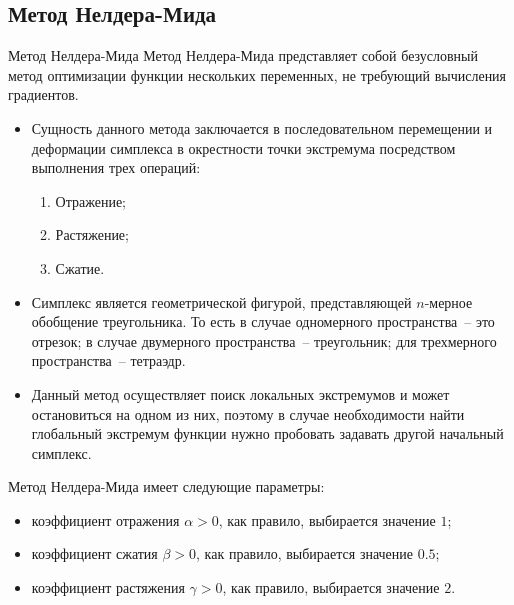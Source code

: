 \documentclass[aspectratio=169, mathserif]{beamer}	%
\begin{document}
\subsection{Метод Нелдера-Мида}

\begin{frame}[fragile]{Метод Нелдера-Мида}
\scriptsize
Метод Нелдера-Мида представляет собой безусловный метод оптимизации функции нескольких переменных, не требующий вычисления градиентов.
\begin{itemize}
	\item Сущность данного метода заключается в последовательном перемещении и деформации симплекса в окрестности точки экстремума посредством выполнения трех операций:

\begin{enumerate}
	\scriptsize
	\item Отражение;
	\item Растяжение;
	\item Сжатие.
\end{enumerate}

	\item Симплекс является геометрической фигурой, представляющей $n$-мерное обобщение треугольника. То есть в случае одномерного пространства~-- это отрезок; в случае двумерного пространства~-- треугольник; для трехмерного пространства~-- тетраэдр.
	\item Данный метод осуществляет поиск локальных экстремумов и может остановиться на одном из них, поэтому в случае необходимости найти глобальный экстремум функции нужно пробовать задавать другой начальный симплекс.
\end{itemize}
Метод Нелдера-Мида  имеет следующие параметры:
\begin{itemize}
	\item коэффициент отражения $\alpha > 0$, как правило, выбирается значение $1$;
	\item коэффициент сжатия $\beta > 0$, как правило, выбирается значение $0.5$;
	\item коэффициент растяжения $\gamma > 0$, как правило, выбирается значение $2$.
\end{itemize}
\vfill
\end{frame}
\end{document}
